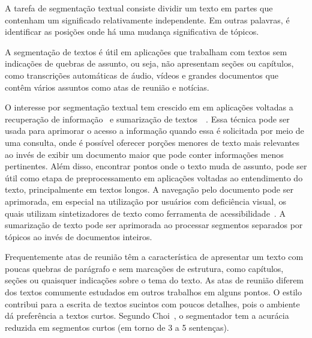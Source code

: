 A tarefa de segmentação textual consiste dividir um texto em partes que contenham um significado relativamente independente. Em outras palavras, é identificar as posições onde há uma mudança significativa de tópicos. 

A segmentação de textos é útil em aplicações que trabalham com textos sem indicações de quebras de assunto, ou seja, não apresentam seções ou capítulos, como transcrições automáticas de áudio, vídeos e grandes documentos que contêm vários assuntos como atas de reunião e notícias.


O interesse por segmentação textual tem crescido em em aplicações voltadas a recuperação de informação~\cite{Reynar1999} %
e sumarização de textos~\cite{Boguraev2000}~\cite{Boguraev2000b}. %
Essa técnica pode ser usada para aprimorar o acesso a informação quando essa é solicitada por meio de uma consulta, onde é possível oferecer porções menores de texto mais relevantes ao invés de exibir um documento maior que pode conter informações menos pertinentes. 
%
Além disso, encontrar pontos onde o texto muda de assunto, pode ser útil como etapa de preprocessamento em aplicações voltadas ao entendimento do texto, principalmente em textos longos.
%
A navegação pelo documento pode ser aprimorada, em especial na utilização por usuários com deficiência visual, os quais utilizam  sintetizadores de texto como ferramenta de acessibilidade~\cite{Choi2000}. 
%
A sumarização de texto pode ser aprimorada ao processar segmentos separados por tópicos ao invés de documentos inteiros. 



%
Frequentemente atas de reunião têm a característica de apresentar um texto com poucas quebras de parágrafo e sem marcações de estrutura, como capítulos, seções ou quaisquer indicações sobre o tema do texto. 
%
As atas de reunião diferem dos textos comumente estudados em outros trabalhos em alguns pontos. O estilo contribui para a escrita de textos sucintos com poucos detalhes, pois o ambiente dá preferência a textos curtos. Segundo Choi~\cite{Choi2001-LSA}, o segmentador tem a acurácia reduzida em segmentos curtos (em torno de 3 a 5 sentenças). 

